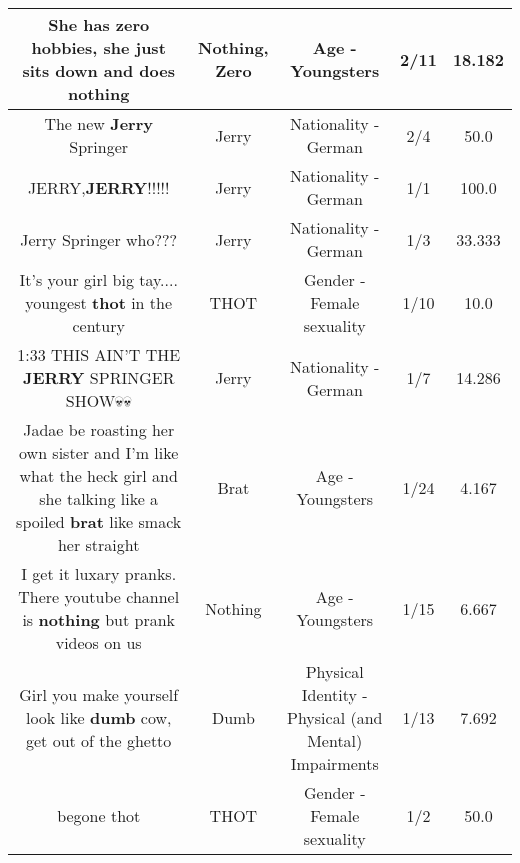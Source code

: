 \documentclass[11pt]{article}
\newlength\mylength
\begin{document}
\begin{center}
\begin{longtable}{|C{.65\mylength}|C{.30\mylength}|C{.12\mylength}|C{.12\mylength}|C{.12\mylength}|}
  \small She has \textbf{zero} hobbies, she just sits down and does nothing\normalsize   & Nothing, Zero & Age - Youngsters & 2/11 & 18.182 \\  \hline
  \small The new \textbf{Jerry} Springer\normalsize   & Jerry & Nationality - German & 2/4 & 50.0 \\  \hline
  \small JERRY,\textbf{JERRY}!!!!!\normalsize   & Jerry & Nationality - German & 1/1 & 100.0 \\  \hline
  \small Jerry Springer who???\normalsize   & Jerry & Nationality - German & 1/3 & 33.333 \\  \hline
  \small It's your girl big tay.... youngest \textbf{thot} in the century\normalsize   & THOT & Gender - Female sexuality & 1/10 & 10.0 \\  \hline
  \small 1:33 THIS AIN'T THE \textbf{JERRY} SPRINGER SHOW💀💀\normalsize   & Jerry & Nationality - German & 1/7 & 14.286 \\  \hline
  \small Jadae be roasting her own sister and I'm like what the heck girl and she talking like a spoiled \textbf{brat} like smack her straight\normalsize   & Brat & Age - Youngsters & 1/24 & 4.167 \\  \hline
  \small I get it luxary pranks. There youtube channel is \textbf{nothing} but prank videos on us\normalsize   & Nothing & Age - Youngsters & 1/15 & 6.667 \\  \hline
  \small Girl you make yourself look like \textbf{dumb} cow, get out of the ghetto\normalsize   & Dumb & Physical Identity - Physical (and Mental) Impairments & 1/13 & 7.692 \\  \hline
  \small begone thot\normalsize   & THOT & Gender - Female sexuality & 1/2 & 50.0 \\  \hline

\end{longtable}
\end{center}
\end{document}
